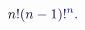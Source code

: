 \documentclass[12pt]{article}
\begin{document}
\makeatletter
\renewcommand*{\@textcolor}[3]{%
  \protect\leavevmode
  \begingroup
    \color#1{#2}#3%
  \endgroup
}
\makeatother
\begin{displaymath}
\mathcolor[RGB]{0,0,15}{n} \mathcolor[RGB]{0,0,30}{!} \mathcolor[RGB]{0,0,45}{(} \mathcolor[RGB]{0,0,60}{n} \mathcolor[RGB]{0,0,75}{-} \mathcolor[RGB]{0,0,90}{1} \mathcolor[RGB]{0,0,105}{)} \mathcolor[RGB]{0,0,120}{!} ^ { \mathcolor[RGB]{0,0,135}{n} } \mathcolor[RGB]{0,0,150}{.}
\end{displaymath}
\end{document}
